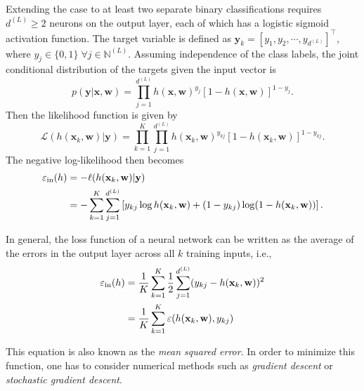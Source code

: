 Extending the case to at least two separate binary classifications requires $d^{(L)}\geq 2$ neurons on the output layer, each of which has a logistic sigmoid activation function. The target variable is defined as $\mathbf{y}_k=[y_1,y_2,\cdots,y_{d^{(L)}}]^{\top}$, where $y_j\in\{0,1\}\;\forall j\in\mathbb{N}^{(L)}$. Assuming independence of the class labels, the joint conditional distribution of the targets given the input vector is
$$
p(\mathbf{y}|\mathbf{x},\mathbf{w})=\prod_{j=1}^{d^{(L)}}h(\mathbf{x},\mathbf{w})^{y_j}\left[1-h(\mathbf{x},\mathbf{w})\right]^{1-y_j}.
$$
Then the likelihood function is given by
$$
\mathcal{L}(h(\mathbf{x}_k,\mathbf{w})|\mathbf{y})=\prod_{k=1}^{K}\prod_{j=1}^{d^{(L)}}h(\mathbf{x}_{k},\mathbf{w})^{y_{kj}}\left[1-h(\mathbf{x}_{k},\mathbf{w})\right]^{1-y_{kj}}.
$$
The negative log-likelihood then becomes
\begin{align}
\varepsilon_{\mathrm{in}}(h)&=-\ell (h(\mathbf{x}_{k},\mathbf{w})|\mathbf{y})\nonumber\\
&=-\sum_{k=1}^{K}\sum_{j=1}^{d^{(L)}}\left[y_{kj}\log h(\mathbf{x}_{k},\mathbf{w})+(1-y_{kj})\log(1-h(\mathbf{x}_{k},\mathbf{w}))\right].\label{eq:mlogitein}
\end{align}

In general, the loss function of a neural network can be written as the average of the errors in the output layer across all $k$ training inputs, i.e.,
\begin{align}
\varepsilon_{\mathrm{in}}(h)&=\frac{1}{K}\sum_{k=1}^K\frac{1}{2}\sum_{j=1}^{d^{(L)}}(y_{kj}-h(\mathbf{x}_{k},\mathbf{w}))^2\\
&=\frac{1}{K}\sum_{k=1}^K\varepsilon(h(\mathbf{x}_{k},\mathbf{w}),y_{kj})
\end{align}

This equation is also known as the \textit{mean squared error}. In order to minimize this function, one has to consider numerical methods such as \textit{gradient descent} or \textit{stochastic gradient descent}.

